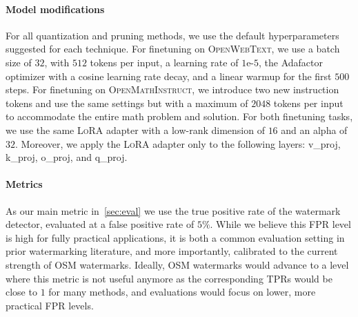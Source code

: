 \paragraph{Model modifications}
For all quantization and pruning methods, we use the default hyperparameters suggested for each technique. 
For finetuning on \textsc{OpenWebText}, we use a batch size of $32$, with $512$ tokens per input, a learning rate of $1\text{e-}5$, the Adafactor optimizer with a cosine learning rate decay, and a linear warmup for the first $500$ steps. 
For finetuning on \textsc{OpenMathInstruct}, we introduce two new instruction tokens and use the same settings but with a maximum of $2048$ tokens per input to accommodate the entire math problem and solution. 
For both finetuning tasks, we use the same \textsc{LoRA} adapter with a low-rank dimension of $16$ and an alpha of $32$. 
Moreover, we apply the \textsc{LoRA} adapter only to the following layers: v\_proj, k\_proj, o\_proj, and q\_proj.

\paragraph{Metrics}
As our main metric in~\cref{sec:eval} we use the true positive rate of the watermark detector, evaluated at a false positive rate of $5\%$.
While we believe this FPR level is high for fully practical applications, it is both a common evaluation setting in prior watermarking literature, and more importantly, calibrated to the current strength of OSM watermarks.
Ideally, OSM watermarks would advance to a level where this metric is not useful anymore as the corresponding TPRs would be close to $1$ for many methods, and evaluations would focus on lower, more practical FPR levels.
